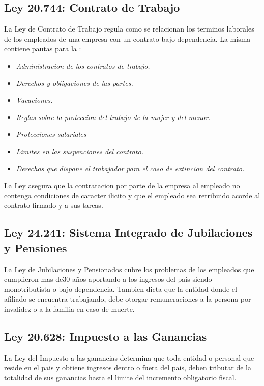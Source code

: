 \documentclass[
10pt, %
a4paper, %
oneside, %
headinclude,footinclude, %
BCOR5mm, %
]{scrartcl}
\begin{document}
\subsection{Ley 20.744: Contrato de Trabajo}
La Ley de Contrato de Trabajo regula como se relacionan los terminos laborales
de los empleados de una empresa con un contrato bajo dependencia.
La misma contiene pautas para la :
\begin{itemize}
  \item \emph{Administracion de los contratos de trabajo.}
  \item \emph{Derechos y obligaciones de las partes.}
  \item \emph{Vacaciones.}
  \item \emph{Reglas sobre la proteccion del trabajo de la mujer y del menor.}
  \item \emph{Protecciones salariales}
  \item \emph{Limites en las suspenciones del contrato.}
  \item \emph{Derechos que dispone el trabajador para el caso de extincion
              del contrato.}
\end{itemize}
La Ley asegura que la contratacion por parte de la empresa al empleado
no contenga condiciones de caracter ilicito y que el empleado sea
retribuido acorde al contrato firmado y a sus tareas.

\subsection{Ley 24.241: Sistema Integrado de Jubilaciones y Pensiones}
La Ley de Jubilaciones y Pensionados cubre los problemas de los empleados
que cumplieron mas de30 a\~nos aportando a los ingresos del pais siendo
monotributista o bajo dependencia.
Tambien dicta que la entidad donde el afiliado se encuentra trabajando,
debe otorgar remuneraciones a la persona por invalidez o a la familia
en caso de muerte.

\subsection{Ley 20.628: Impuesto a las Ganancias}
La Ley del Impuesto a las ganancias determina que toda entidad o personal
que reside en el pais y obtiene ingresos dentro o fuera del pais, deben
tributar de la totalidad de sus ganancias hasta el limite del incremento
obligatorio fiscal.
\end{document}
